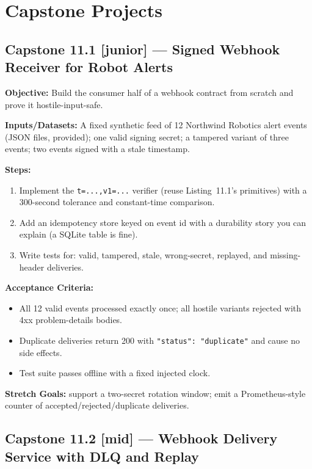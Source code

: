 \section{Capstone Projects}
\label{sec:ch11-capstones}

\subsection{Capstone 11.1 [junior] --- Signed Webhook Receiver for Robot Alerts}

\textbf{Objective:} Build the consumer half of a webhook contract from
scratch and prove it hostile-input-safe.

\textbf{Inputs/Datasets:} A fixed synthetic feed of 12 Northwind Robotics
alert events (JSON files, provided); one valid signing secret; a tampered
variant of three events; two events signed with a stale timestamp.

\textbf{Steps:}
\begin{enumerate}
  \item Implement the \texttt{t=...,v1=...} verifier (reuse
        Listing~11.1's primitives) with a 300-second tolerance and
        constant-time comparison.
  \item Add an idempotency store keyed on event id with a durability story
        you can explain (a SQLite table is fine).
  \item Write tests for: valid, tampered, stale, wrong-secret, replayed, and
        missing-header deliveries.
\end{enumerate}

\textbf{Acceptance Criteria:}
\begin{itemize}[label=$\square$]
  \item All 12 valid events processed exactly once; all hostile variants
        rejected with 4xx problem-details bodies.
  \item Duplicate deliveries return 200 with \texttt{"status": "duplicate"}
        and cause no side effects.
  \item Test suite passes offline with a fixed injected clock.
\end{itemize}

\textbf{Stretch Goals:} support a two-secret rotation window; emit a
Prometheus-style counter of accepted/rejected/duplicate deliveries.

\subsection{Capstone 11.2 [mid] --- Webhook Delivery Service with DLQ and Replay}

